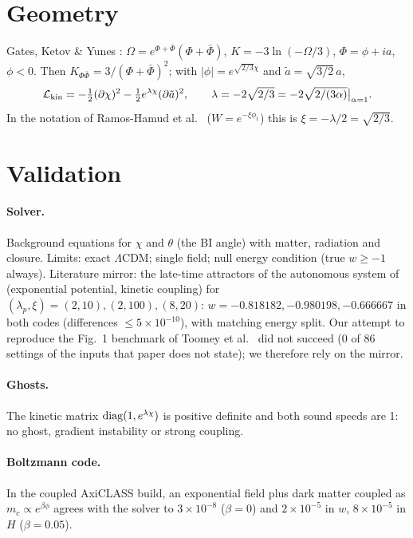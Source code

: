 \documentclass[11pt]{article}
\begin{document}
\section{Geometry}\label{sec:geo}
Gates, Ketov \& Yunes \cite{gky2009}: $\Omega=e^{\Phi+\bar\Phi}(\Phi+\bar\Phi)$, $K=-3\ln(-\Omega/3)$,
$\Phi=\phi+ia$, $\phi<0$. Then $K_{\Phi\bar\Phi}=3/(\Phi+\bar\Phi)^2$; with $|\phi|=e^{\sqrt{2/3}\chi}$ and
$\tilde a=\sqrt{3/2}\,a$,
\begin{equation}
\mathcal L_{\rm kin}=-\tfrac12(\partial\chi)^2-\tfrac12e^{\lambda\chi}(\partial\tilde a)^2,\qquad
\lambda=-2\sqrt{2/3}=-2\sqrt{2/(3\alpha)}\big|_{\alpha=1}.
\end{equation}
In the notation of Ramos-Hamud et al.\ \cite{ramos2026} ($W=e^{-\xi\phi_1}$) this is $\xi=-\lambda/2=\sqrt{2/3}$.

\section{Validation}\label{sec:val}
\paragraph{Solver.} Background equations for $\chi$ and $\theta$ (the BI angle) with matter, radiation and closure.
Limits: exact $\Lambda$CDM; single field; null energy condition (true $w\ge-1$ always). Literature mirror: the
late-time attractors of the autonomous system of \cite{ramos2026} (exponential potential, kinetic coupling) for
$(\lambda_p,\xi)=(2,10),(2,100),(8,20)$: $w=-0.818182,-0.980198,-0.666667$ in both codes (differences
$\le5\times10^{-10}$), with matching energy split. Our attempt to reproduce the Fig.~1 benchmark of Toomey et al.\
\cite{toomey2025} did not succeed (0 of 86 settings of the inputs that paper does not state); we therefore rely on the
\cite{ramos2026} mirror.
\paragraph{Ghosts.} The kinetic matrix ${\rm diag}(1,e^{\lambda\chi})$ is positive definite and both sound speeds are
1: no ghost, gradient instability or strong coupling.
\paragraph{Boltzmann code.} In the coupled AxiCLASS build, an exponential field plus dark matter coupled as
$m_c\propto e^{\beta\phi}$ agrees with the solver to $3\times10^{-8}$ ($\beta=0$) and
$2\times10^{-5}$ in $w$, $8\times10^{-5}$ in $H$ ($\beta=0.05$).
\end{document}
